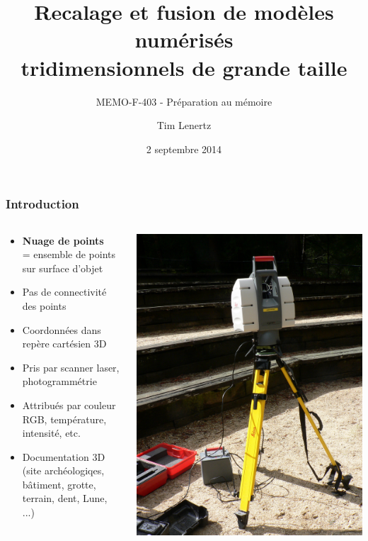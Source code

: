 \documentclass{beamer}
\title{\textbf{Recalage et fusion de modèles numérisés\\tridimensionnels de grande taille}}
\subtitle{MEMO-F-403 - Préparation au mémoire}
\author{Tim Lenertz}
\date{2 septembre 2014}
\institute{ULB}
\begin{document}
\begin{frame}
\frametitle{Introduction}
	\begin{columns}
	\begin{column}[T]{.7\textwidth}
		\begin{itemize}
		\item \textbf{Nuage de points}\\
			= ensemble de points sur surface d'objet
		\item Pas de connectivité des points
		\item Coordonnées dans repère cartésien 3D 
		\item Pris par scanner laser, photogrammétrie
		\item Attribués par couleur RGB, température, intensité, etc.
		\item Documentation 3D \\
			(site archéologiqes, bâtiment, grotte, terrain, dent, Lune, ...)
		\end{itemize}
	\end{column}
	\begin{column}[T]{.3\textwidth}
		\includegraphics[width=\textwidth]{lidar.jpg}
	\end{column}
	\end{columns}
\end{frame}
\end{document}
